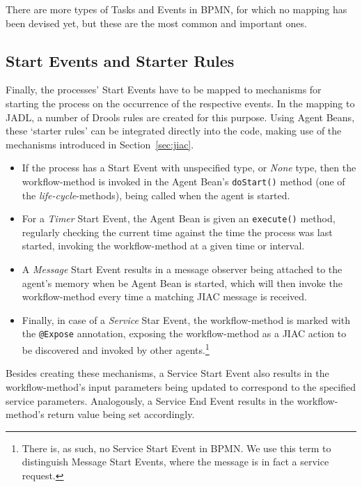 There are more types of Tasks and Events in BPMN, for which no mapping has been
devised yet, but these are the most common and important ones.




\subsection{Start Events and Starter Rules}

Finally, the processes' Start Events have to be mapped to mechanisms for starting
the process on the occurrence of the respective events.  In the mapping to JADL,
a number of Drools rules are created for this purpose.  Using Agent Beans, these
`starter rules' can be integrated directly into the code, making use of the
mechanisms introduced in Section~\ref{sec:jiac}.

\begin{itemize}
	\item If the process has a Start Event with unspecified type, or \emph{None}
	type, then the workflow-method is invoked in the Agent Bean's \verb_doStart()_
	method (one of the \emph{life-cycle}-methods), being called when the agent is
	started.

	\item For a \emph{Timer} Start Event, the Agent Bean is given an \verb_execute()_
	method, regularly checking the current time against the time the process was
	last started, invoking the workflow-method at a given time or interval.

	\item A \emph{Message} Start Event results in a message observer being attached
	to the agent's memory when be Agent Bean is started, which will then invoke
	the workflow-method every time a matching JIAC message is received.

	\item Finally, in case of a \emph{Service} Star Event, the workflow-method is
	marked with the \verb_@Expose_ annotation, exposing the workflow-method as a
	JIAC action to be discovered and invoked by other agents.\footnote{There is,
	as such, no Service Start Event in BPMN.  We use this term to distinguish
	Message Start Events, where the message is in fact a service request.}
\end{itemize}

Besides creating these mechanisms, a Service Start Event also results in the
workflow-method's input parameters being updated to correspond to the specified
service parameters.  Analogously, a Service End Event results in the workflow-method's
return value being set accordingly.

